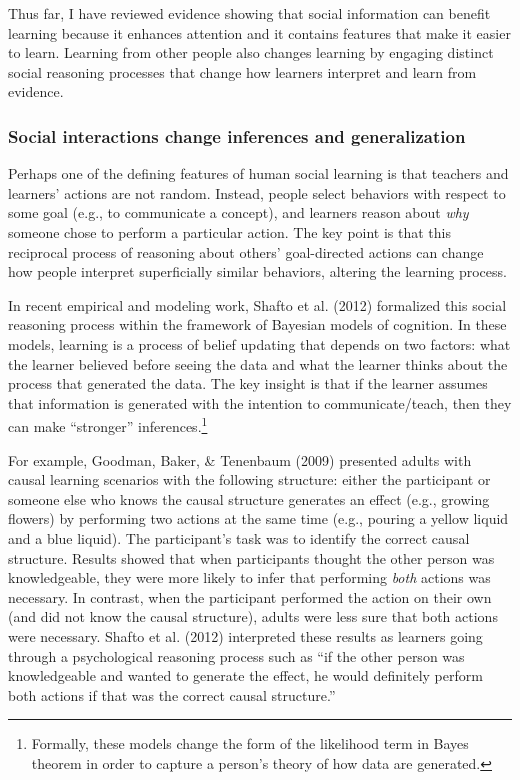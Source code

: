 \documentclass[a4paper,man,apacite,floatsintext]{apa6}
\begin{document}
Thus far, I have reviewed evidence showing that social information can
benefit learning because it enhances attention and it contains features
that make it easier to learn. Learning from other people also changes
learning by engaging distinct social reasoning processes that change how
learners interpret and learn from evidence.

\subsubsection{Social interactions change inferences and
generalization}\label{social-interactions-change-inferences-and-generalization}

Perhaps one of the defining features of human social learning is that
teachers and learners' actions are not random. Instead, people select
behaviors with respect to some goal (e.g., to communicate a concept),
and learners reason about \emph{why} someone chose to perform a
particular action. The key point is that this reciprocal process of
reasoning about others' goal-directed actions can change how people
interpret superficially similar behaviors, altering the learning
process.

In recent empirical and modeling work, Shafto et al. (2012) formalized
this social reasoning process within the framework of Bayesian models of
cognition. In these models, learning is a process of belief updating
that depends on two factors: what the learner believed before seeing the
data and what the learner thinks about the process that generated the
data. The key insight is that if the learner assumes that information is
generated with the intention to communicate/teach, then they can make
``stronger'' inferences.\footnote{Formally, these models change the form
  of the likelihood term in Bayes theorem in order to capture a person's
  theory of how data are generated.}

For example, Goodman, Baker, \& Tenenbaum (2009) presented adults with
causal learning scenarios with the following structure: either the
participant or someone else who knows the causal structure generates an
effect (e.g., growing flowers) by performing two actions at the same
time (e.g., pouring a yellow liquid and a blue liquid). The
participant's task was to identify the correct causal structure. Results
showed that when participants thought the other person was
knowledgeable, they were more likely to infer that performing
\emph{both} actions was necessary. In contrast, when the participant
performed the action on their own (and did not know the causal
structure), adults were less sure that both actions were necessary.
Shafto et al. (2012) interpreted these results as learners going through
a psychological reasoning process such as ``if the other person was
knowledgeable and wanted to generate the effect, he would definitely
perform both actions if that was the correct causal structure.''
\end{document}
